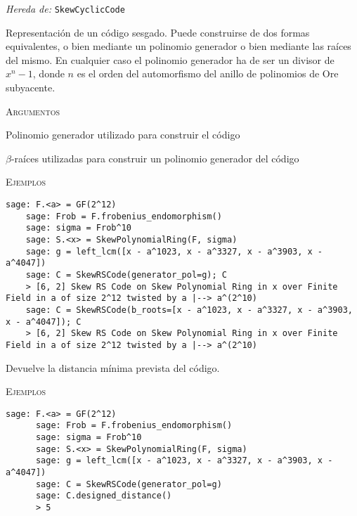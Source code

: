 \begin{description}[leftmargin=1em, font=\normalfont\ttfamily, style=nextline]
  \item[class SkewRSCode(self, generator\_pol=None, b\_roots=None)]
  
  \emph{Hereda de:} \texttt{SkewCyclicCode}

  Representación de un código  sesgado.
  Puede construirse de dos formas equivalentes, o bien mediante un polinomio generador o bien mediante las raíces del mismo.
  En cualquier caso el polinomio generador ha de ser un divisor de \(x^n - 1\), donde \(n\) es el orden del automorfismo del anillo de polinomios de Ore subyacente.

  \textsc{Argumentos}
  \begin{description}[font=\normalfont\ttfamily]
    \item[generator\_pol] Polinomio generador utilizado para construir el código
    \item[b\_roots] \(\beta\)-raíces utilizadas para construir un polinomio generador del código 
  \end{description}

  \textsc{Ejemplos}
  \begin{lstlisting}[gobble=4]
    sage: F.<a> = GF(2^12)
    sage: Frob = F.frobenius_endomorphism()
    sage: sigma = Frob^10
    sage: S.<x> = SkewPolynomialRing(F, sigma)
    sage: g = left_lcm([x - a^1023, x - a^3327, x - a^3903, x - a^4047])
    sage: C = SkewRSCode(generator_pol=g); C
    > [6, 2] Skew RS Code on Skew Polynomial Ring in x over Finite Field in a of size 2^12 twisted by a |--> a^(2^10)
    sage: C = SkewRSCode(b_roots=[x - a^1023, x - a^3327, x - a^3903, x - a^4047]); C
    > [6, 2] Skew RS Code on Skew Polynomial Ring in x over Finite Field in a of size 2^12 twisted by a |--> a^(2^10)
  \end{lstlisting}

  \begin{description}[font=\ttfamily, style=nextline]
    \item[designed\_distance(self)] Devuelve la distancia mínima prevista del código.
    
    \textsc{Ejemplos}
    \begin{lstlisting}[gobble=6]
      sage: F.<a> = GF(2^12)
      sage: Frob = F.frobenius_endomorphism()
      sage: sigma = Frob^10
      sage: S.<x> = SkewPolynomialRing(F, sigma)
      sage: g = left_lcm([x - a^1023, x - a^3327, x - a^3903, x - a^4047])
      sage: C = SkewRSCode(generator_pol=g)
      sage: C.designed_distance()
      > 5
    \end{lstlisting}
  \end{description}
\end{description}


